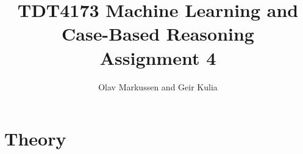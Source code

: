 \documentclass{article}
\begin{document}
\title{TDT4173 Machine Learning and Case-Based Reasoning \\ Assignment 4}

\author{Olav Markussen and Geir Kulia}

\maketitle

\begin{abstract}

\end{abstract}

\section{Theory}
	\label{sec:theory}
	

{}

\end{document}
